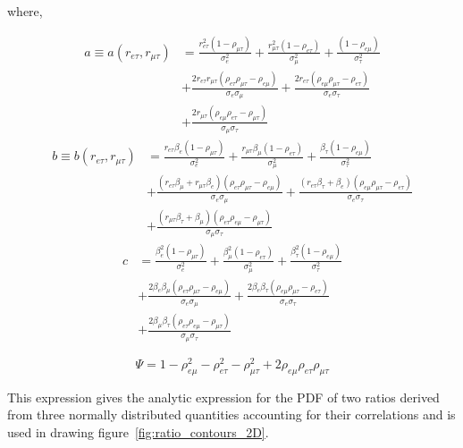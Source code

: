 \noindent where,

\begin{align} 
    a \equiv a\left(r_{e\tau}, r_{\mu\tau}\right) 
            &= \frac{r_{e\tau}^{2}\left(1 - \rho_{\mu\tau} \right)}{\sigma_{e}^{2}}
            + \frac{r_{\mu\tau}^{2}\left(1 - \rho_{e\tau} \right)}{\sigma_{\mu}^{2}}
            + \frac{\left(1 - \rho_{e\mu} \right)}{\sigma_{\tau}^{2}} \\
            \nonumber
            &+ \frac{2r_{e\tau}r_{\mu\tau}\left( \rho_{e\tau} \rho_{\mu\tau}   - \rho_{e\mu} \right)}{\sigma_{e}\sigma_{\mu}} 
            \nonumber
            + \frac{2r_{e\tau}\left( \rho_{e\mu} \rho_{\mu\tau}   - \rho_{e\tau} \right)}{\sigma_{e}\sigma_{\tau}} \\
            \nonumber
            &+ \frac{2r_{\mu\tau}\left( \rho_{e\mu} \rho_{e\tau}   - \rho_{\mu\tau} \right)}{\sigma_{\mu}\sigma_{\tau}}
\end{align}
\begin{align}
    b \equiv b(r_{e\tau}, r_{\mu\tau}) 
        &= \frac{r_{e\tau}\beta_{e}\left(1 - \rho_{\mu\tau} \right)}{\sigma_{e}^{2}}
        + \frac{r_{\mu\tau}\beta_{\mu}\left(1 - \rho_{e\tau} \right)}{\sigma_{\mu}^{2}}
        + \frac{\beta_{\tau}\left(1 - \rho_{e\mu} \right)}{\sigma_{\tau}^{2}} \\
        \nonumber
        &+ \frac{\left(r_{e\tau}\beta_{\mu} + r_{\mu\tau}\beta_{e}\right)\left( \rho_{e\tau} \rho_{\mu\tau} - \rho_{e\mu} \right)}{\sigma_{e}\sigma_{\mu}}
        \nonumber
        + \frac{\left(r_{e\tau}\beta_{\tau} + \beta_{e}\right)\left( \rho_{e\mu} \rho_{\mu\tau}   - \rho_{e\tau} \right)}{\sigma_{e}\sigma_{\tau}} \\ 
        \nonumber
        &+ \frac{\left(r_{\mu\tau}\beta_{\tau} + \beta_{\mu}\right)\left( \rho_{e\tau} \rho_{e\mu}   - \rho_{\mu\tau} \right)}{\sigma_{\mu}\sigma_{\tau}}
\end{align}
\begin{align}
    c &= \frac{\beta_{e}^{2}\left(1 - \rho_{\mu\tau} \right)}{\sigma_{e}^{2}}
    + \frac{\beta_{\mu}^{2}\left(1 - \rho_{e\tau} \right)}{\sigma_{\mu}^{2}}
    + \frac{\beta_{\tau}^{2}\left(1 - \rho_{e\mu} \right)}{\sigma_{\tau}^{2}} \\
        \nonumber
        &+ \frac{2\beta_{e}\beta_{\mu}\left( \rho_{e\tau} \rho_{\mu\tau} - \rho_{e\mu} \right)}{\sigma_{e}\sigma_{\mu}}
        \nonumber
        + \frac{2\beta_{e}\beta_{\tau}\left( \rho_{e\mu} \rho_{\mu\tau}   - \rho_{e\tau} \right)}{\sigma_{e}\sigma_{\tau}} \\ 
        \nonumber
        &+ \frac{2\beta_{\mu}\beta_{\tau}\left( \rho_{e\tau} \rho_{e\mu}   - \rho_{\mu\tau} \right)}{\sigma_{\mu}\sigma_{\tau}}
\end{align}

\begin{equation}
    \Psi = 1 - \rho_{e\mu}^{2} - \rho_{e\tau}^{2} - \rho_{\mu\tau}^{2} + 2\rho_{e\mu}\rho_{e\tau}\rho_{\mu\tau}
\end{equation}

\noindent This expression gives the analytic expression for the PDF of two ratios
derived from three normally distributed quantities accounting for their
correlations and is used in drawing figure~\ref{fig:ratio_contours_2D}.
\FloatBarrier